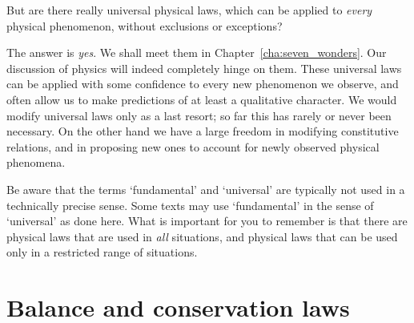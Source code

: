 \documentclass[a4paper,12pt,%
onecolumn,oneside,%
british%
]{memoir}
\renewcommand*{\|}[1][]{\nonscript\:#1\vert\nonscript\:\mathopen{}}
\newcommand*{\chap}{Chapter}%
\begin{document}
But are there really universal physical laws, which can be applied to \emph{every} physical phenomenon, without exclusions or exceptions?

The answer is \emph{yes}. We shall meet them in \chap~\ref{cha:seven_wonders}. Our discussion of physics will indeed completely hinge on them. These universal laws can be applied with some confidence to every new phenomenon we observe, and often allow us to make predictions of at least a qualitative character. We would modify universal laws only as a last resort; so far this has rarely or never been necessary. On the other hand we have a large freedom in modifying constitutive relations, and in proposing new ones to account for newly observed physical phenomena.

\begin{warning}
  Be aware that the terms \enquote*{fundamental} and \enquote*{universal} are typically not used in a technically precise sense. Some texts may use \enquote*{fundamental} in the sense of \enquote*{universal} as done here. What is important for you to remember is that there are physical laws that are used in \emph{all} situations, and physical laws that can be used only in a restricted range of situations.
\end{warning}

\section{Balance and conservation laws}
\label{sec:balance_intro}
\end{document}
